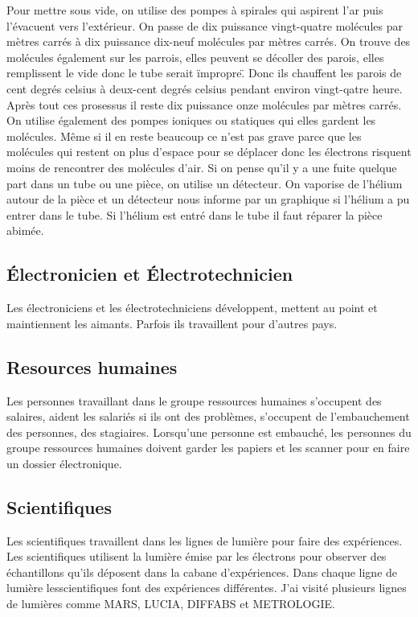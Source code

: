 			Pour mettre sous vide, on utilise des pompes à spirales qui aspirent l'ar puis l'évacuent vers l'extérieur. On passe de dix puissance vingt-quatre molécules par mètres carrés à dix puissance dix-neuf molécules par mètres carrés. On trouve des molécules également sur les parrois, elles peuvent se décoller des parois, elles remplissent le vide donc le tube serait \"impropre\". Donc ils chauffent les parois de cent degrés celsius à deux-cent degrés celsius pendant environ vingt-qatre heure. Après tout ces prosessus il reste dix puissance onze molécules par mètres carrés. On utilise également des pompes ioniques ou statiques qui elles gardent les molécules. Même si il en reste beaucoup ce n'est pas grave parce que les molécules qui restent on plus d'espace pour se déplacer donc les électrons risquent moins de rencontrer des molécules d'air. Si on pense qu'il y a une fuite quelque part dans un tube ou une pièce, on utilise un détecteur. On vaporise de l'hélium autour de la pièce et un détecteur nous informe par un graphique si l'hélium a pu entrer dans le tube. Si l'hélium est entré dans le tube il faut réparer la pièce abimée.  
		
		\subsection{Électronicien et Électrotechnicien}
			Les électroniciens et les électrotechniciens développent, mettent au point et maintiennent les aimants. Parfois ils travaillent pour d'autres pays.
		
		\subsection{Resources humaines}
			Les personnes travaillant dans le groupe ressources humaines s'occupent des salaires, aident les salariés si ils ont des problèmes, s'occupent de l'embauchement des personnes, des stagiaires. Lorsqu'une personne est embauché, les personnes du groupe ressources humaines doivent garder les papiers et les scanner pour en faire un dossier électronique. 

		\subsection{Scientifiques}
			Les scientifiques travaillent dans les lignes de lumière pour faire des expériences. Les scientifiques utilisent la lumière émise par les électrons pour observer des échantillons qu'ils déposent dans la cabane d'expériences. Dans chaque ligne de lumière lesscientifiques font des expériences différentes. J'ai visité plusieurs lignes de lumières comme MARS, LUCIA, DIFFABS et METROLOGIE.
			
